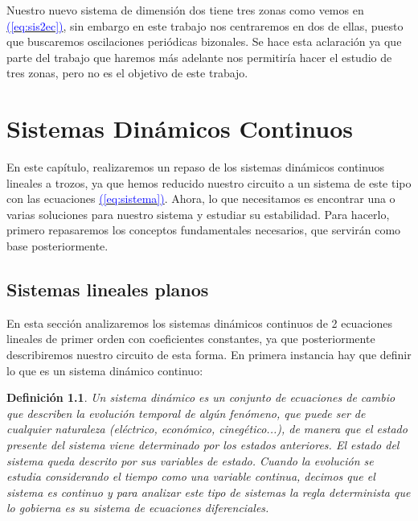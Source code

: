 \documentclass[12pt,a4paper]{report} %
\newtheorem{definicion}{Definición}[chapter]
\newtheorem{definicion}{Definición}[chapter] %
\newcommand{\eref}[1]{\hyperref[#1]{\textcolor{blue}{(\ref*{#1})}}}
\newcommand{\eref}[1]{\hyperref[#1]{\textcolor{blue}{\textit{(\ref*{#1})}}}}
\begin{document}

	
	\vspace{0.5cm}Nuestro nuevo sistema de dimensión dos tiene tres zonas como vemos en \eref{eq:sis2ec}, sin embargo en este trabajo nos centraremos en dos de ellas, puesto que buscaremos oscilaciones periódicas bizonales. Se hace esta aclaración ya que parte del trabajo que haremos más adelante nos permitiría hacer el estudio de tres zonas, pero no es el objetivo de este trabajo.

	
	\chapter{Sistemas Dinámicos Continuos}
	En este capítulo, realizaremos un repaso de los sistemas dinámicos continuos lineales a trozos, ya que hemos reducido nuestro circuito a un sistema de este tipo con las ecuaciones \eref{eq:sistema}. Ahora, lo que necesitamos es encontrar una o varias soluciones para nuestro sistema y estudiar su estabilidad. Para hacerlo, primero repasaremos los conceptos fundamentales necesarios, que servirán como base posteriormente.
	
	\section{Sistemas lineales planos}
	\label{sec:sislinplanos}
	En esta sección analizaremos los sistemas dinámicos continuos de 2 ecuaciones lineales de primer orden con coeficientes constantes, ya que posteriormente describiremos nuestro circuito de esta forma.
	En primera instancia hay que definir lo que es un sistema dinámico continuo:
	
	\vspace{0.5cm}\begin{definicion}
		Un sistema dinámico es un conjunto de ecuaciones de cambio que describen la evolución temporal de algún fenómeno, que puede ser de cualquier naturaleza (eléctrico, económico, cinegético...), de manera que el estado presente del sistema viene determinado por los estados anteriores. El estado del sistema queda descrito por sus variables de estado. Cuando la evolución se estudia considerando el tiempo como una variable 
		continua, decimos que el sistema es continuo y para analizar este tipo de sistemas la regla determinista que lo gobierna es su sistema de ecuaciones diferenciales.
	\end{definicion}
	
\end{document}
